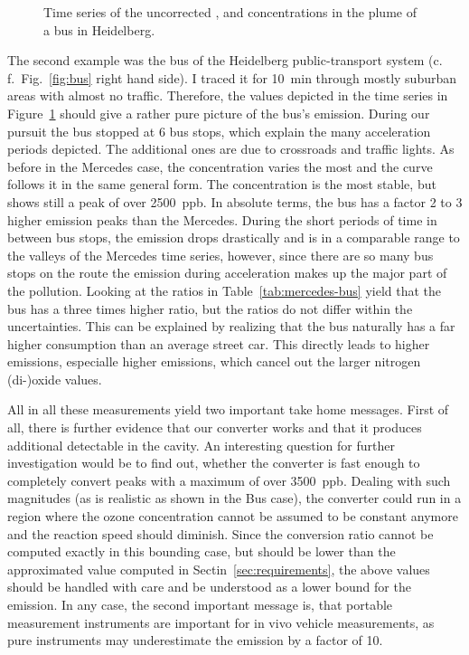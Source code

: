\begin{figure}[htbp]
  \centering
  
  \caption{Time series of the uncorrected ,  and 
    concentrations in the plume of a bus in Heidelberg.}
  \label{fig:bus-ts}
\end{figure}

The second example was the bus of the Heidelberg public-transport
system (c.\,f.\ Fig.~\ref{fig:bus} right hand side). I traced it for
\SI{10}{\minute} through mostly suburban areas with almost no
traffic. Therefore, the values depicted in the time series in
Figure~\ref{fig:bus-ts} should give a rather pure picture of the bus's
emission. During our pursuit the bus stopped at 6 bus stops, which
explain the many acceleration periods depicted. The additional ones
are due to crossroads and traffic lights. As before in the Mercedes
case, the  concentration varies the most and the 
curve follows it in the same general form. The  concentration
is the most stable, but shows still a peak of over \SI{2500}{ppb}. In
absolute terms, the bus has a factor 2 to 3 higher
 emission peaks than the Mercedes. During the short periods
of time in between bus stops, the emission drops drastically and is in
a comparable range to the valleys of the Mercedes time series,
however, since there are so many bus stops on the route the emission
during acceleration makes up the major part of the pollution. Looking
at the ratios in Table~\ref{tab:mercedes-bus} yield that the bus has
a three times higher  ratio, but the  ratios do not
differ within the uncertainties. This can be explained by realizing
that the bus naturally has a far higher consumption than an average
street car. This directly leads to higher emissions, especialle higher
 emissions, which cancel out the larger nitrogen (di-)oxide
values.

All in all these measurements yield two important take home
messages. First of all, there is further evidence that our converter
works and that it produces additional detectable  in the
cavity. An interesting question for further investigation would be to
find out, whether the converter is fast enough to completely convert
 peaks with a maximum of over \SI{3500}{ppb}. Dealing with
such magnitudes (as is realistic as shown in the Bus case), the
converter could run in a region where the ozone concentration cannot
be assumed to be constant anymore and the reaction speed should
diminish. Since the conversion ratio cannot be computed exactly in
this bounding case, but should be lower than the approximated value
computed in Sectin~\ref{sec:requirements}, the above  values
should be handled with care and be understood as a lower bound for the
emission. In any case, the second important message is, that portable
 measurement instruments are important for in vivo vehicle
measurements, as pure  instruments may underestimate the
 emission by a factor of 10.


